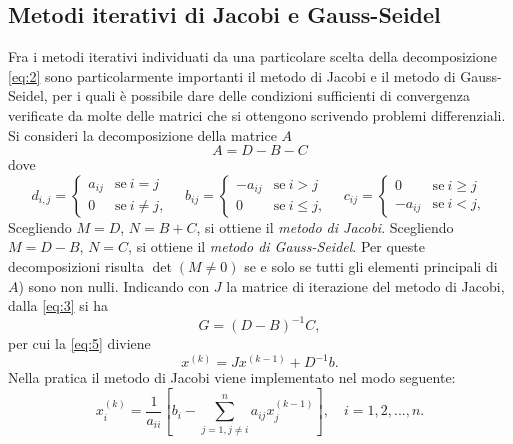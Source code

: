 \documentclass[12pt]{article}
\begin{document}
\subsection{Metodi iterativi di Jacobi e Gauss-Seidel}
Fra i metodi iterativi individuati da una particolare scelta della decomposizione \eqref{eq:2} sono particolarmente importanti il metodo di Jacobi e il metodo di Gauss-Seidel, per i quali è possibile dare delle condizioni sufficienti di convergenza verificate da molte delle matrici che si ottengono scrivendo problemi differenziali.\\
Si consideri la decomposizione della matrice \(A\)
\begin{equation*}
    A=D-B-C
\end{equation*}
dove
\begin{equation*}
    d_{i,j}=
    \begin{cases}
        a_{ij} &\text{se}\: i=j\\
        0 &\text{se} \: i \neq j,
    \end{cases}
    \quad
    b_{ij}=
    \begin{cases}
        -a_{ij} &\text{se}\: i>j\\
        0 &\text{se} \: i \leq j,
    \end{cases}
    \quad
    c_{ij}=
    \begin{cases}
        0 &\text{se}\: i \geq j\\
        -a_{ij} &\text{se} \: i<j,
    \end{cases}
\end{equation*}
Scegliendo \(M=D\), \quad \(N=B+C\), si ottiene il \textit{metodo di Jacobi}.
Scegliendo \(M=D-B\), \quad \(N=C\), si ottiene il \textit{metodo di Gauss-Seidel}.
Per queste decomposizioni risulta \(\det(M \neq 0)\) se e solo se tutti gli elementi principali di \(A\)) sono non nulli.
Indicando con \(J\) la matrice di iterazione del metodo di Jacobi, dalla \eqref{eq:3} si ha
\begin{equation*}
    G=(D-B)^{-1}C,
\end{equation*}
per cui la \eqref{eq:5} diviene
\begin{equation*}
    x^{(k)}=Jx^{(k-1)}+D^{-1}b.
\end{equation*}
Nella pratica il metodo di Jacobi viene implementato nel modo seguente:
\begin{equation}
    \label{eq:8}
    x^{(k)}_i=\frac{1}{a_{ii}} \left[ b_i - \sum_{j=1,j \neq i}^n a_{ij}x_j^{(k-1)} \right], \quad i=1,2,...,n.
\end{equation}
\end{document}
